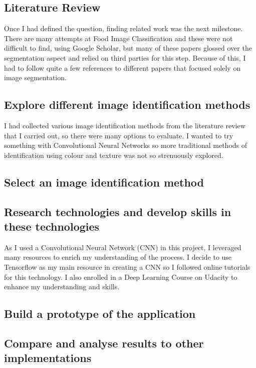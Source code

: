 \subsection*{Literature Review}
Once I had defined the question, finding related work was the next milestone.
There are many attempts at Food Image Classification and these were not difficult to find, using Google Scholar, but many of these papers glossed over the segmentation aspect and relied on third parties for this step.
Because of this, I had to follow quite a few references to different papers that focused solely on image segmentation.

\subsection*{Explore different image identification methods}
I had collected various image identification methods from the literature review
that I carried out, so there were many options to evaluate.
I wanted to try something with Convolutional Neural Networks so more traditional
methods of identification using colour and texture was not so strenuously explored.

\subsection*{Select an image identification method}

\subsection*{Research technologies and develop skills in these technologies}
As I used a Convolutional Neural Network (CNN) in this project, I leveraged many resources to enrich my understanding of the process.
I decide to use Tensorflow as my main resource in creating a CNN so I followed online tutorials for this technology.
I also enrolled in a Deep Learning Course on Udacity to enhance my understanding and skills.

\subsection*{Build a prototype of the application}

\subsection*{Compare and analyse results to other implementations}



